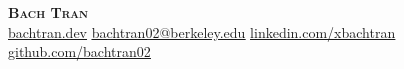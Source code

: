 \begin{center}
    \textbf{\LARGE \scshape Bach Tran} \\ \vspace{1pt}
    \href{https://bachtran.dev}{ \underline{bachtran.dev}} \quad
    \href{mailto:bachtran02@berkeley.edu}{ \underline{bachtran02@berkeley.edu}} \quad
    \href{https://www.linkedin.com/in/xbachtran/}{ \underline{linkedin.com/xbachtran}} \quad
    \href{https://github.com/bachtran02}{ \underline{github.com/bachtran02}}
\end{center}